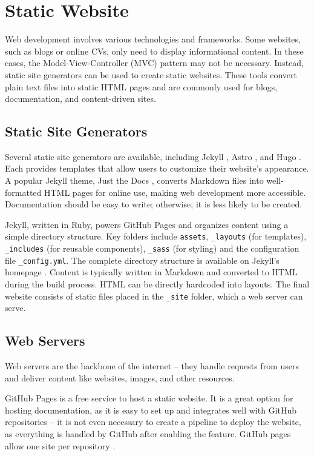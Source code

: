 \section{Static Website}
Web development involves various technologies and frameworks. Some websites, such as blogs or online CVs, only need to display informational content. In these cases, the Model-View-Controller (MVC) pattern may not be necessary. Instead, static site generators can be used to create static websites. These tools convert plain text files into static HTML pages and are commonly used for blogs, documentation, and content-driven sites.

\subsection{Static Site Generators}
Several static site generators are available, including Jekyll \Parencite{jekyll}, Astro \parencite{astro}, and Hugo \Parencite{hugo}. Each provides templates that allow users to customize their website's appearance. A popular Jekyll theme, Just the Docs \Parencite{just-the-docs}, converts Markdown files into well-formatted HTML pages for online use, making web development more accessible. Documentation should be easy to write; otherwise, it is less likely to be created.

Jekyll, written in Ruby, powers GitHub Pages \Parencite{GitHubPagesJekyll} and organizes content using a simple directory structure. Key folders include \texttt{assets}, \texttt{\_layouts} (for templates), \texttt{\_includes} (for reusable components), \texttt{\_sass} (for styling) and the configuration file \texttt{\_config.yml}. The complete directory structure is available on Jekyll's homepage \Parencite{jekyll}. Content is typically written in Markdown and converted to HTML during the build process. HTML can be directly hardcoded into layouts. The final website consists of static files placed in the \texttt{\_site} folder, which a web server can serve.

\subsection{Web Servers}
Web servers are the backbone of the internet -- they handle requests from users and deliver content like websites, images, and other resources. 

GitHub Pages is a free service to host a static website. It is a great option for hosting documentation, as it is easy to set up and integrates well with GitHub repositories -- it is not even necessary to create a pipeline to deploy the website, as everything is handled by GitHub after enabling the feature. GitHub pages allow one site per repository \Parencite{GitHubPagesLimits}.


